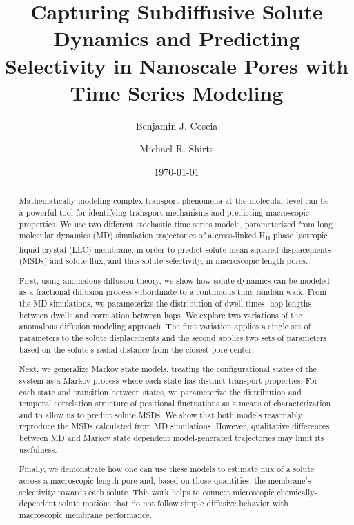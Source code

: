 \documentclass[aps,pre,preprint,groupedaddress,longbibliography]{revtex4-2}
\begin{document}
  
  \title{Capturing Subdiffusive Solute Dynamics and Predicting Selectivity in Nanoscale Pores
  with Time Series Modeling}
  
  \author{Benjamin J. Coscia}
  \author{Michael R. Shirts}
  

  \date{\today}
  
  \begin{abstract}
  
  Mathematically modeling complex transport phenomena at the molecular level 
  can be a powerful tool for identifying transport mechanisms and predicting
  macroscopic properties. We use two different stochastic time series models,
  parameterized from long molecular dynamics (MD) simulation trajectories of
  a cross-linked H\textsubscript{II} phase lyotropic liquid crystal (LLC) 
  membrane, in order to predict solute mean squared displacements (MSDs) 
  and solute flux, and thus solute selectivity, in macroscopic length pores. 

  First, using anomalous diffusion theory, we show how solute dynamics can be
  modeled as a fractional diffusion process subordinate to a continuous time 
  random walk. From the MD simulations, we parameterize the distribution of 
  dwell times, hop lengths between dwells and correlation between hops. We 
  explore two variations of the anomalous diffusion modeling approach. The first variation
  applies a single set of parameters to the solute displacements and the second
  applies two sets of parameters based on the solute's radial distance from the
  closest pore center. 

  Next, we generalize Markov state models, treating the
  configurational states of the system as a Markov process where each
  state has distinct transport properties. For each state and transition
  between states, we parameterize the distribution and temporal correlation 
  structure of positional fluctuations as a means of characterization and to 
  allow us to predict solute MSDs. We show that both models reasonably reproduce
  the MSDs calculated from MD simulations. However, qualitative differences 
  between MD and Markov state dependent model-generated trajectories may limit 
  its usefulness. 

  Finally, we demonstrate how one can use these models to 
  estimate flux of a solute across a macroscopic-length pore and, based on 
  those quantities, the membrane's selectivity towards each solute. This work 
  helps to connect microscopic chemically-dependent solute motions that do not
  follow simple diffusive behavior with macroscopic membrane performance.

  \end{abstract}
\end{document}

